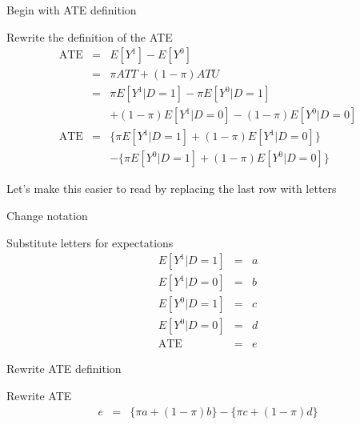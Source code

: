 \documentclass{beamer}
\begin{document}
\begin{frame}{Begin with ATE definition}

  \begin{block}{Rewrite the definition of the ATE}
    \begin{eqnarray*}
      \text{ATE}&=&E[Y^1]-E[Y^0]  \\
      &=& \pi ATT + (1-\pi) ATU \\
      &=& \pi E[Y^1 | D=1] - \pi E[Y^0 | D=1]  \\
      & & + (1-\pi) E[Y^1|D=0] - (1-\pi) E[Y^0 | D=0] \\
      \text{ATE}&=& \{\pi E[Y^1 | D=1] + (1-\pi)E[Y^1 | D=0]\}  \\
      & & - \{\pi E[Y^0|D=1] + (1-\pi) E[Y^0 | D=0]\}
    \end{eqnarray*}
  \end{block}

\bigskip

Let's make this easier to read by replacing the last row with letters

\end{frame}

\begin{frame}{Change notation}



  \begin{block}{Substitute letters for expectations}
    \begin{eqnarray*}
      E[Y^1|D=1] &=& a  \\
      E[Y^1|D=0] &=& b  \\
      E[Y^0|D=1] &=& c  \\
      E[Y^0|D=0] &=& d  \\
      \text{ATE} &=& e
    \end{eqnarray*}
  \end{block}
  



\end{frame}

\begin{frame}{Rewrite ATE definition}


  \begin{block}{Rewrite ATE}
    \begin{eqnarray*}
      e&=&\{\pi{a} + (1-\pi)b\} - \{\pi{c} + (1-\pi)d\}
    \end{eqnarray*}
  \end{block}

\end{frame}
\end{document}
